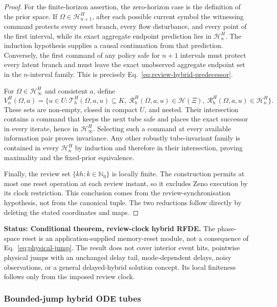 \documentclass[11pt]{article}
\theoremstyle{definition}
\newcommand{\status}[1]{\par\smallskip\noindent\textbf{Status: #1.}\quad}
\begin{document}
\begin{proof}
For the finite-horizon assertion, the zero-horizon case is the definition
of the prior space.  If $\Omega\in\mathcal H_{n+1}^H$, after each possible
current symbol the witnessing command protects every reset branch, every
flow disturbance, and every point of the first interval, while its exact
aggregate endpoint prediction lies in $\mathcal H_n^H$.  The induction
hypothesis supplies a causal continuation from that prediction.  Conversely,
the first command of any policy safe for $n+1$ intervals must protect every
latent branch and must leave the exact unobserved aggregate endpoint set in
the $n$-interval family.  This is precisely
Eq.~\eqref{eq:review-hybrid-predecessor}.

For $\Omega\in\mathcal H_\infty^H$ and consistent $a$, define
\[
V_n^H(\Omega,a)=\{u\in U:
\mathscr T_h^H(\Omega,a,u)\subseteq K,\
\mathscr R_h^H(\Omega,a,u)\in\mathcal H(\Xi),\
\mathscr R_h^H(\Omega,a,u)\in\mathcal H_n^H\}.
\]
These sets are non-empty, closed in compact $U$, and nested.  Their
intersection contains a command that keeps the next tube safe and places
the exact successor in every iterate, hence in $\mathcal H_\infty^H$.
Selecting such a command at every available information pair proves
invariance.  Any other robustly tube-invariant family is contained in every
$\mathcal H_n^H$ by induction and therefore in their intersection, proving
maximality and the fixed-prior equivalence.

Finally, the review set $\{kh:k\in\mathbb N_0\}$ is locally finite.  The
construction permits at most one reset operation at each review instant, so
it excludes Zeno execution by its clock restriction.  This conclusion comes
from the review-synchronisation hypothesis, not from the canonical tuple.
The two reductions follow directly by deleting the stated coordinates and
maps.
\end{proof}

\status{Conditional theorem, review-clock hybrid RFDE} The phase-space reset
is an application-supplied memory-reset module, not a consequence of
Eq.~\eqref{eq:physical-jump}.  The result does not cover interior event
hits, pointwise physical jumps with an unchanged delay tail, mode-dependent
delays, noisy observations, or a general delayed-hybrid solution concept.
Its local finiteness follows only from the imposed review clock.

\subsubsection{Bounded-jump hybrid ODE tubes}
\end{document}
